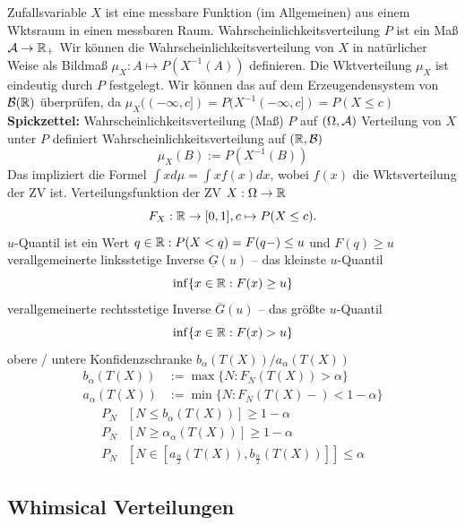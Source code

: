 \begin{outline}
    \1 Zufallsvariable $X$ ist eine messbare Funktion (im Allgemeinen) aus einem Wktsraum in einen messbaren Raum.
    \1 Wahrscheinlichkeitsverteilung $P$ ist ein Maß $\mathcal{A} \rightarrow \mathbb{R}_+$ 
\0 Wir können die Wahrscheinlichkeitsverteilung von $X$ in natürlicher Weise als Bildmaß $\mu_X : A \mapsto P(X^{-1}(A))$ definieren. 
    \1 Die Wktverteilung $\mu_X$ ist eindeutig durch $P$ festgelegt. Wir können das auf dem Erzeugendensystem von $\mathcal{B}(\mathbb{R})$ überprüfen, da $\mu_X((-\infty,c]) = P(X^{-1}(-\infty,c]) = P(X\leq c)$ 
\0 \textbf{Spickzettel:}
    \1 Wahrscheinlichkeitsverteilung (Maß) $P$ auf $(\Omega,\mathcal{A})$
    \1 Verteilung von $X$ unter $P$ definiert Wahrscheinlichkeitsverteilung auf $(\mathbb{R},\mathcal{B})$
    $$\mu_X(B):=P(X^{-1}(B))$$
    Das impliziert die Formel $\int x d\mu = \int x f(x) dx$, wobei $f(x)$ die Wktsverteilung der ZV ist.
    \1 Verteilungsfunktion der ZV $X:\Omega\rightarrow\mathbb{R}$
    $$F_X:\mathbb{R}\rightarrow [0,1], c \mapsto P(X\leq c).$$
    \1 $u$-Quantil ist ein Wert $q\in \mathbb{R}: P(X < q)=F(q-)\leq u$ und $F(q)\geq u$
    \1 verallgemeinerte linksstetige Inverse $\underline{G}(u)$ -- das kleinste $u$-Quantil
    $$\inf \{x\in\mathbb{R}: F(x)\geq u\}$$
    \1 verallgemeinerte rechtsstetige Inverse $\overline{G}(u)$ -- das größte $u$-Quantil
    $$\inf \{x\in\mathbb{R}: F(x)> u\}$$
    \1 obere / untere Konfidenzschranke $b_\alpha(T(X)) / a_\alpha(T(X))$
    \begin{align}
        b_\alpha(T(X)) &:= \max \{ N : F_N(T(X)) > \alpha\}     \\
        a_\alpha(T(X)) &:= \min \{ N : F_N(T(X)-)< 1-\alpha\} 
    \end{align}
    \begin{align}
        P_N&[N\leq b_\alpha(T(X))] \geq 1- \alpha \\
        P_N&[N\geq \alpha_\alpha(T(X))] \geq 1-\alpha \\
        P_N&[N\in [a_{\frac{\alpha}{2}}(T(X)),b_{\frac{\alpha}{2}}(T(X))]] \leq \alpha        
    \end{align}
\end{outline}

\subsection{Whimsical Verteilungen}

